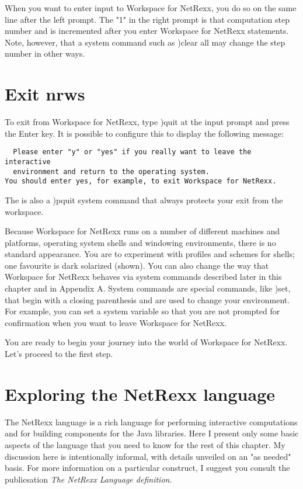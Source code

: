 
When you want to enter input to Workspace for NetRexx, you do so on the same line after the left prompt. The "1" in the right prompt is that computation step number and is incremented after you enter Workspace for NetRexx statements. Note, however, that a system command such as )clear all may change the step number in other ways.

\section{Exit nrws}
To exit from Workspace for NetRexx, type )quit at the input prompt and press the Enter key. It is possible to configure this to display the following message:
\begin{verbatim}
  Please enter "y" or "yes" if you really want to leave the interactive
  environment and return to the operating system.
You should enter yes, for example, to exit Workspace for NetRexx.
\end{verbatim}
The is also a )pquit system command that always protects your exit from the workspace.

Because Workspace for NetRexx runs on a number of different machines and platforms, operating system shells and windowing environments, there is no standard appearance. You are to experiment with profiles and schemes for shells; one favourite is dark solarized (shown). You can also change the way that Workspace for NetRexx behaves via system commands described later in this chapter and in Appendix A. System commands are special commands, like )set, that begin with a closing parenthesis and are used to change your environment. For example, you can set a system variable so that you are not prompted for confirmation when you want to leave Workspace for NetRexx.

You are ready to begin your journey into the world of Workspace for NetRexx. Let's proceed to the first step.

 \section{Exploring the NetRexx language}

The NetRexx language is a rich language for performing interactive computations and for building components for the Java libraries. Here I present only some basic aspects of the language that you need to know for the rest of this chapter. My discussion here is intentionally informal, with details unveiled on an "as needed" basis. For more information on a particular construct, I suggest you consult the publicsation \emph{The NetRexx Language definition}.

